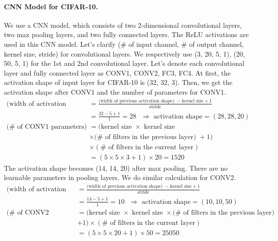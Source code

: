 \documentclass[11pt]{article}
\begin{document}
\paragraph{CNN Model for CIFAR-10.} We use a CNN model, which consists of two 2-dimensional convolutional layers, two max pooling layers, and two fully connected layers. The ReLU activations are used in this CNN model. Let's clarify ($\#$ of input channel, $\#$ of output channel, kernel size, stride) for convolutional layers. We respectively use (3, 20, 5, 1), (20, 50, 5, 1) for the 1st and 2nd convolutional layer. Let's denote each convolutional layer and fully connected layer as CONV1, CONV2, FC3, FC4. At first, the activation shape of input layer for CIFAR-10 is (32, 32, 3). Then, we get the activation shape after CONV1 and the number of parameters for CONV1.
\begin{align*}
    (\textrm{width of activation shape) } &= \frac{\textrm{(width of previous activation shape) } - \textrm{kernel size} + 1}{\textrm{stride}} \\
    &= \frac{32-5+1}{1} = 28 \textrm{ } \Rightarrow \textrm{ activation shape} = (28, 28, 20) \\
    (\# \textrm{ of CONV1 parameters) } &= \Big(\textrm{kernel size } \times \textrm{ kernel size } \\
    &\times (\# \textrm{ of filters in the previous layer) }+1 \Big) \\
    &\times (\# \textrm{ of filters in the current layer}) \\
    &= (5 \times 5 \times 3 + 1) \times 20 = 1520
\end{align*}
The activation shape becomes (14, 14, 20) after max pooling. There are no learnable parameters in pooling layers. We do similar calculation for CONV2.
\begin{align*}
    (\textrm{width of activation shape) } &= \frac{\textrm{(width of previous activation shape) } - \textrm{kernel size} + 1}{\textrm{stride}} \\
    &= \frac{14-5+1}{1} = 10 \textrm{ } \Rightarrow \textrm{ activation shape} = (10, 10, 50) \\
    (\# \textrm{ of CONV2 parameters) } &= \Big(\textrm{kernel size } \times \textrm{ kernel size } \times (\# \textrm{ of filters in the previous layer) }\\
    &+1\Big) \times (\# \textrm{ of filters in the current layer}) \\
    &= (5 \times 5 \times 20 + 1) \times 50 = 25050
\end{align*}
\end{document}
